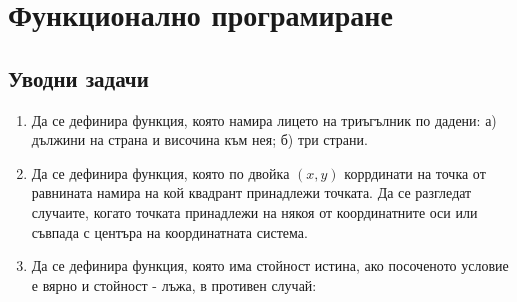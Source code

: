\chapter{Функционално програмиране}

\setcounter{section}{21}

\section {Уводни задачи}

\begin{enumerate}[]

  \item Да се дефинира функция, която намира лицето на триъгълник по дадени: а) дължини на страна и височина към нея; б) три страни.
  
  \item Да се дефинира функция, която по двойка $(x,y)$ коррдинати на точка от равнината намира на кой квадрант принадлежи точката. Да се разгледат случаите, когато точката принадлежи на някоя от координатните оси или съвпада с центъра на координатната система.

  \item Да се дефинира функция, която  има стойност истина, ако посоченото условие е вярно и стойност - лъжа, в противен случай:

	\renewcommand{\theenumii}{\Alph{enumii}}


\end{enumerate}
